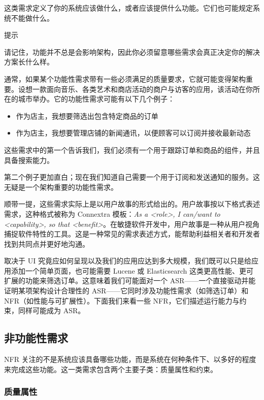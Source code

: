 \label{idx:139}
这类需求定义了你的系统应该做什么，或者应该提供什么功能。它们也可能规定系统不能做什么。

\begin{myTip}{提示}

请记住，功能并不总是会影响架构，因此你必须留意哪些需求会真正决定你的解决方案长什么样。
\end{myTip}

\label{idx:140}
通常，如果某个功能性需求带有一些必须满足的质量要求，它就可能变得架构重要。设想一款面向音乐、各类艺术和商店活动的商户与访客的应用，该活动在你所在的城市举办。它的功能性需求可能有以下几个例子：

\begin{itemize}
\item 作为店主，我想要筛选出包含特定商品的订单
\item 作为店主，我想要管理店铺的新闻通讯，以便顾客可以订阅并接收最新动态
\end{itemize}

这些需求中的第一个告诉我们，我们必须有一个用于跟踪订单和商品的组件，并且具备搜索能力。

第二个例子更加直白；现在我们知道自己需要一个用于订阅和发送通知的服务。这无疑是一个架构重要的功能性需求。

\label{idx:141}
顺带一提，这些需求实际上是以用户故事的形式给出的。用户故事按以下格式表述需求，这种格式被称为 Connextra 模板：\emph{As a <role>, I can/want to <capability>, so that <benefit>}。在敏捷软件开发中，用户故事是一种从用户视角捕捉软件特性的工具。这是一种常见的需求表述方式，能帮助利益相关者和开发者找到共同点并更好地沟通。

\label{idx:142}
取决于 UI 究竟应如何呈现以及我们的应用应达到多大规模，我们既可以只是给应用添加一个简单页面，也可能需要 Lucene 或 Elasticsearch 这类更高性能、更可扩展的功能来筛选订单。这意味着我们可能面对一个 ASR——一个直接驱动并能证明某项架构设计合理性的 ASR——它同时涉及功能性需求（如筛选订单）和 NFR（如性能与可扩展性）。下面我们来看一些 NFR，它们描述运行能力与约束，同样可能成为 ASR。

\subsection{非功能性需求}

\label{idx:143}
NFR 关注的不是系统应该具备哪些功能，而是系统在何种条件下、以多好的程度来完成这些功能。这一类需求包含两个主要子类：质量属性和约束。

\subsubsection{质量属性}

